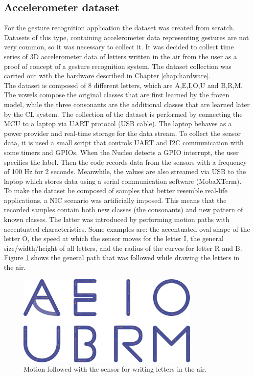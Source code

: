 \documentclass[12pt]{report}
\begin{document}
\subsection{Accelerometer dataset}
For the gesture recognition application the dataset was created from scratch. Datasets of this type, containing accelerometer data representing gestures are not very common, so it was necessary to collect it. It was decided to collect time series of 3D accelerometer data of letters written in the air from the user as a proof of concept of a gesture recognition system.
The dataset collection was carried out with the hardware described in Chapter \ref{chap:hardware}. \\
The dataset is composed of 8 different letters, which are A,E,I,O,U and B,R,M. The vowels compose the original classes that are first learned by the frozen model, while the three consonants are the additional classes that are learned later by the CL system. The collection of the dataset is performed by connecting the MCU to a laptop via UART protocol (USB cable). The laptop behaves as a power provider and real-time storage for the data stream. 
To collect the sensor data, it is used a small script that controls UART and I2C communication with some timers and GPIOs. When the Nucleo detects a GPIO interrupt, the user specifies the label. Then the code records data from the sensors with a frequency of 100 Hz for 2 seconds. Meanwhile, the values are also streamed via USB to the laptop which stores data using a serial communication software (MobaXTerm). \\
To make the dataset be composed of samples that better resemble real-life applications, a NIC scenario was artificially imposed. This means that the recorded samples contain both new classes (the consonants) and new pattern of known classes. The latter was introduced by performing motion paths with accentuated characteristics. Some examples are: the accentuated oval shape of the letter O, the speed at which the sensor moves for the letter I, the general size/width/height of all letters, and the radius of the curves for letter R and B.
Figure \ref{fig:letters_motion} shows the general path that was followed while drawing the letters in the air.\\

\begin{figure}[h!]
    \centering
    \includegraphics[width=90mm]{Figures/Chapter4/letters_motion.jpg} 
    \caption{Motion followed with the sensor for writing letters in the air.}
    \label{fig:letters_motion}    
\end{figure}
\end{document}
